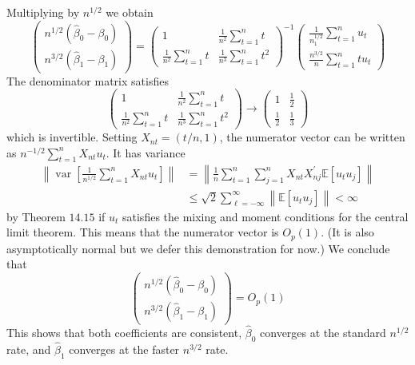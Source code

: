 \documentclass[10pt]{article}
\begin{document}
Multiplying by $n^{1 / 2}$ we obtain
$$
\left(\begin{array}{c}
n^{1 / 2}\left(\widehat{\beta}_{0}-\beta_{0}\right) \\
n^{3 / 2}\left(\widehat{\beta}_{1}-\beta_{1}\right)
\end{array}\right)=\left(\begin{array}{cc}
1 & \frac{1}{n^{2}} \sum_{t=1}^{n} t \\
\frac{1}{n^{2}} \sum_{t=1}^{n} t & \frac{1}{n^{3}} \sum_{t=1}^{n} t^{2}
\end{array}\right)^{-1}\left(\begin{array}{c}
\frac{1}{n_{1}^{1 / 2}} \sum_{t=1}^{n} u_{t} \\
\frac{n^{3 / 2}}{n} \sum_{t=1}^{n} t u_{t}
\end{array}\right)
$$
The denominator matrix satisfies
$$
\left(\begin{array}{cc}
1 & \frac{1}{n^{2}} \sum_{t=1}^{n} t \\
\frac{1}{n^{2}} \sum_{t=1}^{n} t & \frac{1}{n^{3}} \sum_{t=1}^{n} t^{2}
\end{array}\right) \rightarrow\left(\begin{array}{cc}
1 & \frac{1}{2} \\
\frac{1}{2} & \frac{1}{3}
\end{array}\right)
$$
which is invertible. Setting $X_{n t}=(t / n, 1)$, the numerator vector can be written as $n^{-1 / 2} \sum_{t=1}^{n} X_{n t} u_{t}$. It has variance
$$
\begin{aligned}
\left\|\operatorname{var}\left[\frac{1}{n^{1 / 2}} \sum_{t=1}^{n} X_{n t} u_{t}\right]\right\| &=\left\|\frac{1}{n} \sum_{t=1}^{n} \sum_{j=1}^{n} X_{n t} X_{n j}^{\prime} \mathbb{E}\left[u_{t} u_{j}\right]\right\| \\
& \leq \sqrt{2} \sum_{\ell=-\infty}^{\infty}\left\|\mathbb{E}\left[u_{t} u_{j}\right]\right\|<\infty
\end{aligned}
$$
by Theorem $14.15$ if $u_{t}$ satisfies the mixing and moment conditions for the central limit theorem. This means that the numerator vector is $O_{p}(1)$. (It is also asymptotically normal but we defer this demonstration for now.) We conclude that
$$
\left(\begin{array}{c}
n^{1 / 2}\left(\widehat{\beta}_{0}-\beta_{0}\right) \\
n^{3 / 2}\left(\widehat{\beta}_{1}-\beta_{1}\right)
\end{array}\right)=O_{p}(1)
$$
This shows that both coefficients are consistent, $\widehat{\beta}_{0}$ converges at the standard $n^{1 / 2}$ rate, and $\widehat{\beta}_{1}$ converges at the faster $n^{3 / 2}$ rate.
\end{document}
